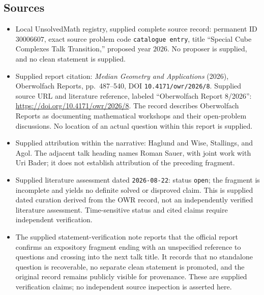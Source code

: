 \documentclass[11pt]{article}
\begin{document}
\subsection{Sources}
\begin{itemize}
\item Local UnsolvedMath registry, supplied complete source record: permanent ID \(30006607\), exact source problem code \texttt{catalogue entry}, title ``Special Cube Complexes Talk Transition,'' proposed year \(2026\). No proposer is supplied, and no clean statement is supplied.
\item Supplied report citation: \emph{Median Geometry and Applications} (2026), Oberwolfach Reports, pp.\ 487--540, DOI \texttt{10.4171/owr/2026/8}. Supplied source URL and literature reference, labeled ``Oberwolfach Report 8/2026'': \url{https://doi.org/10.4171/owr/2026/8}. The record describes Oberwolfach Reports as documenting mathematical workshops and their open-problem discussions. No location of an actual question within this report is supplied.
\item Supplied attribution within the narrative: Haglund and Wise, Stallings, and Agol. The adjacent talk heading names Roman Sauer, with joint work with Uri Bader; it does not establish attribution of the preceding fragment.
\item Supplied literature assessment dated \texttt{2026-08-22}: status \texttt{open}; the fragment is incomplete and yields no definite solved or disproved claim. This is supplied dated curation derived from the OWR record, not an independently verified literature assessment. Time-sensitive status and cited claims require independent verification.
\item The supplied statement-verification note reports that the official report confirms an expository fragment ending with an unspecified reference to questions and crossing into the next talk title. It records that no standalone question is recoverable, no separate clean statement is promoted, and the original record remains publicly visible for provenance. These are supplied verification claims; no independent source inspection is asserted here.
\end{itemize}
\end{document}
